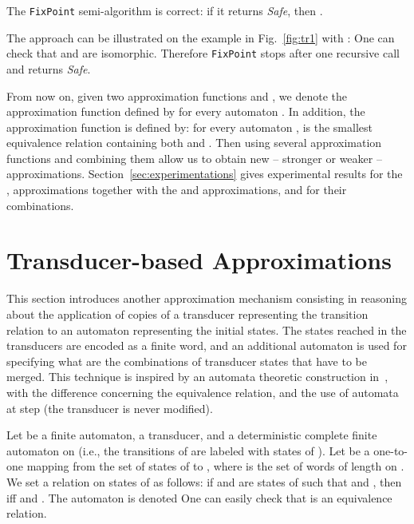 \documentclass[]{llncs}
\begin{document}
\begin{proposition}\label{prop-fixed}
The {\tt FixPoint}  semi-algorithm is correct: if it returns {\em Safe}, then .
\end{proposition}
 





The approach can be illustrated on the example in Fig.~\ref{fig:tr1} with
:  One can check that
  and  are isomorphic. Therefore {\tt FixPoint} stops after one
recursive call and returns {\it Safe}.



From now on, given two approximation functions  and
, we denote  the
approximation function defined by
 for every automaton . In addition, the
approximation function  is defined by: for
every automaton ,  is the
smallest equivalence relation containing both  and
. Then using several approximation functions and
combining them allow us to obtain new -- stronger or weaker --
approximations. Section~\ref{sec:experimentations}
gives experimental results for the ,  approximations together with the  and  approximations, and for their combinations. 




\section{Transducer-based Approximations}
\label{transducer-based-approximations}

This section introduces another approximation mechanism consisting in
reasoning about the application of  copies of a transducer
representing the transition relation to an automaton representing the initial states.  The states reached in the transducers are encoded as a finite word, and an additional automaton is used for specifying
what are the combinations of transducer states that have to be
merged. This technique is inspired by an automata theoretic construction in~\cite{bouajjani_regular_2000}, 
with the difference concerning the equivalence relation, and the use of automata at step  (the transducer is never modified).  


Let  be a finite automaton,
 a transducer, and 
 a deterministic complete finite
automaton on  (i.e., the transitions of  are labeled with states of
).
Let  be a one-to-one mapping from the set
 of states of  to
, where  is the set of words of length  on . We
set a relation  on states of  as follows: if  and 
are states of  such that  and
, then  iff  and . The automaton 
is denoted  One can easily check that  is an
equivalence relation.
\end{document}
